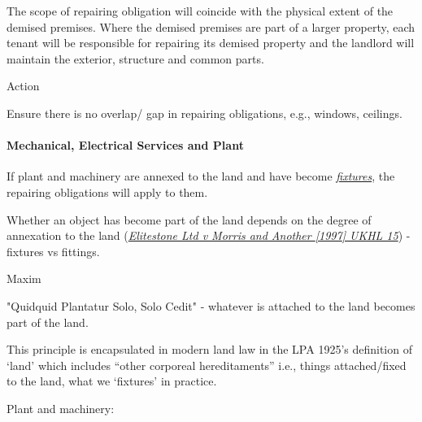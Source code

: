 \documentclass[
]{article}
\newenvironment{env-da05fb3b-c564-4905-b729-fa3c9eadbf7c}
{
    \savenotes\tcolorbox[blanker,breakable,left=5pt,borderline west={2pt}{-4pt}{aquamarine}]
}
{
    \endtcolorbox\spewnotes
}
\newenvironment{env-fdd3b853-72b2-4779-a214-b5da0ccdb5e7}
{
    \savenotes\tcolorbox[blanker,breakable,left=5pt,borderline west={2pt}{-4pt}{gray}]
}
{
    \endtcolorbox\spewnotes
}
\begin{document}
The scope of repairing obligation will coincide with the physical extent
of the demised premises. Where the demised premises are part of a larger
property, each tenant will be responsible for repairing its demised
property and the landlord will maintain the exterior, structure and
common parts.

\begin{env-da05fb3b-c564-4905-b729-fa3c9eadbf7c}

Action

Ensure there is no overlap/ gap in repairing obligations, e.g., windows,
ceilings.

\end{env-da05fb3b-c564-4905-b729-fa3c9eadbf7c}

\hypertarget{mechanical-electrical-services-and-plant}{%
\paragraph{Mechanical, Electrical Services and
Plant}\label{mechanical-electrical-services-and-plant}}

If plant and machinery are annexed to the land and have become
\emph{\href{https://uk.practicallaw.thomsonreuters.com/8-202-2732?originationContext=document\&transitionType=DocumentItem\&contextData=(sc.Default)\&ppcid=966adc813d44458ba2271293efe92ed6}{fixtures}},
the repairing obligations will apply to them.

Whether an object has become part of the land depends on the degree of
annexation to the land
(\emph{\href{https://uk.practicallaw.thomsonreuters.com/D-000-1799?originationContext=document\&transitionType=PLDocumentLink\&contextData=(sc.Default)\&ppcid=966adc813d44458ba2271293efe92ed6}{Elitestone
Ltd v Morris and Another {[}1997{]} UKHL 15}}) - fixtures vs fittings.

\begin{env-fdd3b853-72b2-4779-a214-b5da0ccdb5e7}

Maxim

"Quidquid Plantatur Solo, Solo Cedit" - whatever is attached to the land
becomes part of the land.

\end{env-fdd3b853-72b2-4779-a214-b5da0ccdb5e7}

This principle is encapsulated in modern land law in the LPA 1925's
definition of `land' which includes ``other corporeal hereditaments''
i.e., things attached/fixed to the land, what we `fixtures' in practice.

Plant and machinery:
\end{document}
